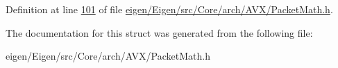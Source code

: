 Definition at line \hyperlink{eigen_2_eigen_2src_2_core_2arch_2_a_v_x_2_packet_math_8h_source_l00101}{101} of file \hyperlink{eigen_2_eigen_2src_2_core_2arch_2_a_v_x_2_packet_math_8h_source}{eigen/\+Eigen/src/\+Core/arch/\+A\+V\+X/\+Packet\+Math.\+h}.



The documentation for this struct was generated from the following file\+:\begin{DoxyCompactItemize}
\item 
eigen/\+Eigen/src/\+Core/arch/\+A\+V\+X/\+Packet\+Math.\+h\end{DoxyCompactItemize}
